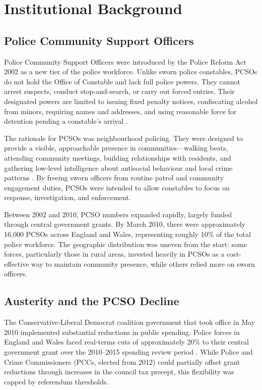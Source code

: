 \documentclass[12pt]{article}
\begin{document}
\section{Institutional Background}

\subsection{Police Community Support Officers}

Police Community Support Officers were introduced by the Police Reform Act 2002 as a new tier of the police workforce. Unlike sworn police constables, PCSOs do not hold the Office of Constable and lack full police powers. They cannot arrest suspects, conduct stop-and-search, or carry out forced entries. Their designated powers are limited to issuing fixed penalty notices, confiscating alcohol from minors, requiring names and addresses, and using reasonable force for detention pending a constable's arrival \citep{crawford2008plural}.

The rationale for PCSOs was neighbourhood policing. They were designed to provide a visible, approachable presence in communities---walking beats, attending community meetings, building relationships with residents, and gathering low-level intelligence about antisocial behaviour and local crime patterns \citep{hmic2016peel}. By freeing sworn officers from routine patrol and community engagement duties, PCSOs were intended to allow constables to focus on response, investigation, and enforcement.

Between 2002 and 2010, PCSO numbers expanded rapidly, largely funded through central government grants. By March 2010, there were approximately 16,000 PCSOs across England and Wales, representing roughly 10\% of the total police workforce. The geographic distribution was uneven from the start: some forces, particularly those in rural areas, invested heavily in PCSOs as a cost-effective way to maintain community presence, while others relied more on sworn officers.

\subsection{Austerity and the PCSO Decline}

The Conservative-Liberal Democrat coalition government that took office in May 2010 implemented substantial reductions in public spending. Police forces in England and Wales faced real-terms cuts of approximately 20\% to their central government grant over the 2010--2015 spending review period \citep{hoc2023staffing}. While Police and Crime Commissioners (PCCs, elected from 2012) could partially offset grant reductions through increases in the council tax precept, this flexibility was capped by referendum thresholds.
\end{document}
